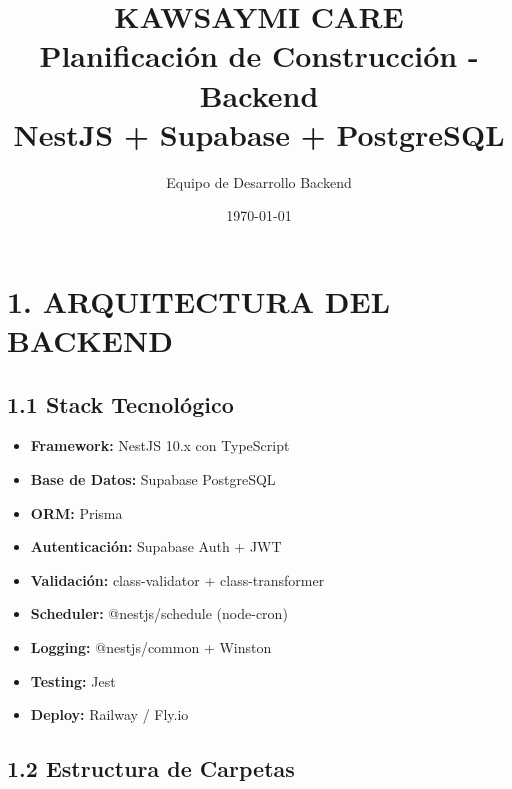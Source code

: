 \documentclass[12pt,a4paper]{article}
\title{
    \vspace{-2cm}
    \huge\textbf{\color{primaryblue}KAWSAYMI CARE}\\
    \Large\color{darkblue}Planificación de Construcción - Backend\\
    \normalsize\color{darktext}NestJS + Supabase + PostgreSQL
}
\author{Equipo de Desarrollo Backend}
\date{\today}
\begin{document}
\maketitle
\thispagestyle{fancy}

\vspace{1cm}

\begin{center}
\end{center}

\newpage
\tableofcontents
\newpage

\section{1. ARQUITECTURA DEL BACKEND}

\subsection{1.1 Stack Tecnológico}

\begin{itemize}
    \item \textbf{Framework:} NestJS 10.x con TypeScript
    \item \textbf{Base de Datos:} Supabase PostgreSQL
    \item \textbf{ORM:} Prisma
    \item \textbf{Autenticación:} Supabase Auth + JWT
    \item \textbf{Validación:} class-validator + class-transformer
    \item \textbf{Scheduler:} @nestjs/schedule (node-cron)
    \item \textbf{Logging:} @nestjs/common + Winston
    \item \textbf{Testing:} Jest
    \item \textbf{Deploy:} Railway / Fly.io
\end{itemize}

\subsection{1.2 Estructura de Carpetas}
\end{document}
